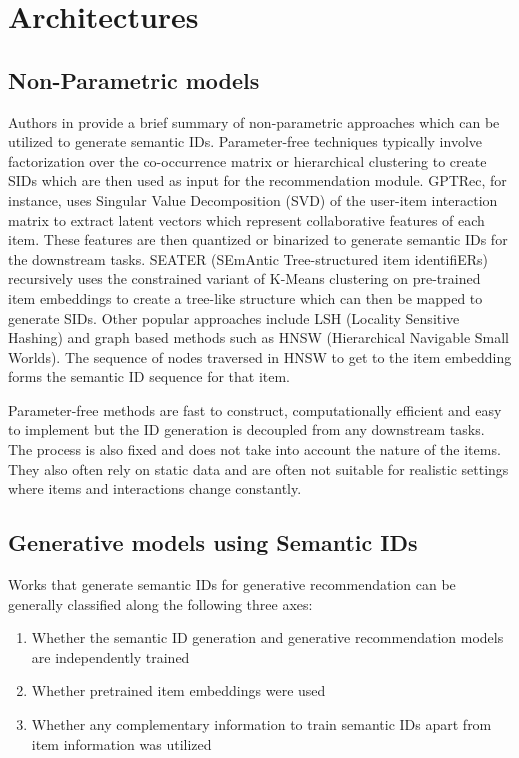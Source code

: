 \documentclass[11pt,a4paper]{article}
\begin{document}
\section{Architectures}
\subsection{Non-Parametric models}
Authors in \cite{2024ETEGRec_liu2025generativerecommenderendtoendlearnable} provide a brief summary of non-parametric approaches which can be utilized to generate semantic IDs. Parameter-free techniques typically involve factorization over the co-occurrence matrix or hierarchical clustering to create SIDs which are then used as input for the recommendation module. GPTRec, for instance, uses Singular Value Decomposition (SVD) of the user-item interaction matrix to extract latent vectors which represent collaborative features of each item. These features are then quantized or binarized to generate semantic IDs for the downstream tasks. SEATER (SEmAntic Tree-structured item identifiERs) recursively uses the constrained variant of K-Means clustering on pre-trained item embeddings to create a tree-like structure which can then be mapped to generate SIDs. Other popular approaches include LSH (Locality Sensitive Hashing) and graph based methods such as HNSW (Hierarchical Navigable Small Worlds). The sequence of nodes traversed in HNSW to get to the item embedding forms the semantic ID sequence for that item.

Parameter-free methods are fast to construct, computationally efficient and easy to implement but the ID generation is decoupled from any downstream tasks. The process is also fixed and does not take into account the nature of the items. They also often rely on static data and are often not suitable for realistic settings where items and interactions change constantly.

\subsection{Generative models using Semantic IDs} \label{subsection:SemanticIDModels}
Works that generate semantic IDs for generative recommendation can be generally classified along the following three axes:

\begin{enumerate}
    \item Whether the semantic ID generation and generative recommendation models are independently trained
    \item Whether pretrained item embeddings were used
    \item Whether any complementary information to train semantic IDs apart from item information was utilized
\end{enumerate}
\end{document}
